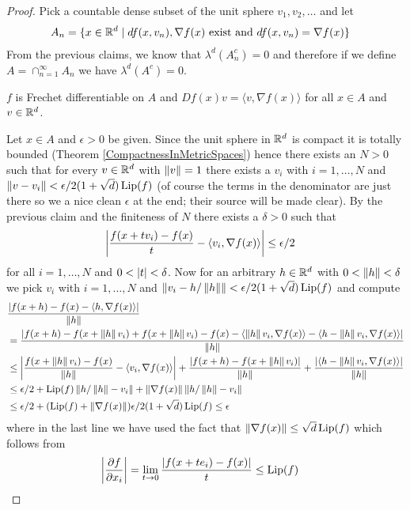 \begin{proof}
Pick a countable dense subset of the unit sphere $v_1, v_2, \dotsc$ and let 
\begin{align*}
A_n &= \lbrace x \in \mathbb{R}^d \mid df(x,v_n), \nabla f(x) \text{ exist  and } df(x,v_n) = \nabla f(x) \rbrace
\end{align*}
From the previous claims, we know that $\lambda^d(A^c_n) = 0$ and therefore if we define $A = \cap_{n=1}^\infty A_n$ we have $\lambda^d(A^c) = 0$.  
\begin{clm} $f$ is Frechet differentiable on $A$ and $Df(x) v = \langle v, \nabla f(x) \rangle$ for all $x \in A$ and $v \in \mathbb{R}^d$.
\end{clm}
Let $x \in A$  and $\epsilon>0$ be given.  Since the unit sphere in $\mathbb{R}^d$ is compact it is totally bounded (Theorem \ref{CompactnessInMetricSpaces}) hence there
exists an $N>0$ such that for every $v \in \mathbb{R}^d$ with $\left \lVert v \right \rVert=1$ there exists a $v_i$ with $i=1, \dotsc, N$ and $\left \lVert v-v_i \right \rVert < \epsilon/2(1+\sqrt{d})\operatorname*{Lip}(f)$ (of course the
terms in the denominator are just there so we a nice clean $\epsilon$ at the end; their source will be made clear).  By the previous claim and the finiteness of $N$ there exists a
$\delta>0$ such that 
\begin{align*}
\left \vert \frac{f(x+tv_i) - f(x)}{t} - \langle v_i, \nabla f(x) \rangle \right \vert &\leq \epsilon/2
\end{align*}
for all $i=1, \dotsc, N$ and $0 < \left \vert t \right \vert < \delta$.  Now for an arbitrary $h \in \mathbb{R}^d$ with $0 < \left \lVert h \right \rVert<\delta$ we pick $v_i$ with $i=1, \dotsc, N$ and $\left \lVert v_i - h/\left \lVert h \right \rVert \right \rVert < \epsilon/2(1+\sqrt{d})\operatorname*{Lip}(f)$
and compute 
\begin{align*}
&\frac{\left \vert f(x + h) - f(x) - \langle h, \nabla f(x) \rangle \right \vert}{\left \lVert h \right \rVert}  \\
&= \frac{\left \vert f(x + h) - f(x + \left \lVert h \right \rVert v_i) + f(x+\left \lVert h \right \rVert v_i) - f(x) - \langle\left \lVert h \right \rVert v_i, \nabla f(x) \rangle - \langle h-\left \lVert h \right \rVert v_i, \nabla f(x) \rangle \right \vert}{\left \lVert h \right \rVert} \\
&\leq \left \vert \frac{ f(x+\left \lVert h \right \rVert v_i) - f(x)}{\left \lVert h \right \rVert} - \langle v_i, \nabla f(x) \rangle  \right \vert + \frac{\left \vert f(x + h) - f(x + \left \lVert h \right \rVert v_i) \right \vert}{\left \lVert h \right \rVert} + \frac{\left \vert \langle h-\left \lVert h \right \rVert v_i, \nabla f(x) \rangle \right \vert}{\left \lVert h \right \rVert}\\
&\leq \epsilon/2 + \operatorname*{Lip}(f) \left \lVert h/\left \lVert h \right \rVert -  v_i \right \rVert + \left \lVert \nabla f(x) \right \rVert \left \lVert h/\left \lVert h \right \rVert- v_i \right \rVert \\
&\leq \epsilon/2 + (\operatorname*{Lip}(f) + \left \lVert \nabla f(x) \right \rVert) \epsilon/2(1+\sqrt{d})\operatorname*{Lip}(f) \leq \epsilon
\end{align*}
where in the last line we have used the fact that $\left \lVert \nabla f(x) \right \rVert \leq \sqrt{d} \operatorname*{Lip}(f)$ which follows from 
\begin{align*}
\left \vert \frac{\partial f}{\partial x_i} \right \vert &= \lim_{t \to 0} \frac{\left \vert f(x+te_i)-f(x) \right \vert}{t} \leq \operatorname*{Lip}(f)
\end{align*}
\end{proof}

